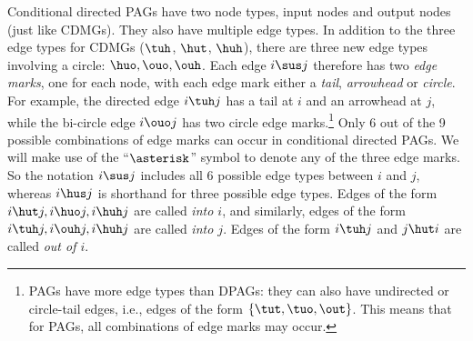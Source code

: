 Conditional directed PAGs have two node types, input nodes and output nodes (just like CDMGs).
They also have multiple edge types. In addition to the three edge types for CDMGs
($\tuh$, $\hut$, $\huh$), there are three new edge types involving a circle: $\huo,\ouo,\ouh$.
Each edge $i \sus j$ therefore has two \emph{edge marks}, one for each node, with each edge mark
either a \emph{tail}, \emph{arrowhead} or \emph{circle}. For example, the directed edge $i \tuh j$ has a 
tail at $i$ and an arrowhead at $j$, while the bi-circle edge $i \ouo j$ has two circle edge marks.\footnote{PAGs have more edge types than DPAGs: they can also have 
undirected or circle-tail edges, i.e., edges of the form $\{\tut,\tuo,\out\}$. This means that for PAGs,
all combinations of edge marks may occur.}
Only 6 out of the 9 possible combinations of edge marks can occur in conditional directed PAGs. We will make use
of the ``$\asterisk$'' symbol to denote any of the three edge marks. So the notation $i \sus j$
includes all 6 possible edge types between $i$ and $j$, whereas $i \hus j$ is shorthand for three
possible edge types.
Edges of the form $i \hut j, i \huo j, i \huh j$ are called \emph{into $i$}, and similarly, edges of the form $i \tuh j, i \ouh j, i \huh j$ are called \emph{into $j$}. Edges of the form $i \tuh j$ and $j \hut i$ are called \emph{out of $i$}.


